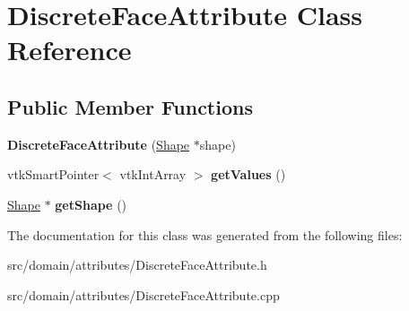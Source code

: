 \hypertarget{class_discrete_face_attribute}{}\section{Discrete\+Face\+Attribute Class Reference}
\label{class_discrete_face_attribute}
\subsection*{Public Member Functions}
\begin{DoxyCompactItemize}
\item 
\hypertarget{class_discrete_face_attribute_ad7183266e3e7d927f2b53ffe4dace110}{}{\bfseries Discrete\+Face\+Attribute} (\hyperlink{class_shape}{Shape} $\ast$shape)\label{class_discrete_face_attribute_ad7183266e3e7d927f2b53ffe4dace110}

\item 
\hypertarget{class_discrete_face_attribute_a9767d19deae2768b95f06499cd6a4bda}{}vtk\+Smart\+Pointer$<$ vtk\+Int\+Array $>$ {\bfseries get\+Values} ()\label{class_discrete_face_attribute_a9767d19deae2768b95f06499cd6a4bda}

\item 
\hypertarget{class_discrete_face_attribute_ac2411ea78be1cc03ef7cd003c802711d}{}\hyperlink{class_shape}{Shape} $\ast$ {\bfseries get\+Shape} ()\label{class_discrete_face_attribute_ac2411ea78be1cc03ef7cd003c802711d}

\end{DoxyCompactItemize}


The documentation for this class was generated from the following files\+:\begin{DoxyCompactItemize}
\item 
src/domain/attributes/Discrete\+Face\+Attribute.\+h\item 
src/domain/attributes/Discrete\+Face\+Attribute.\+cpp\end{DoxyCompactItemize}
